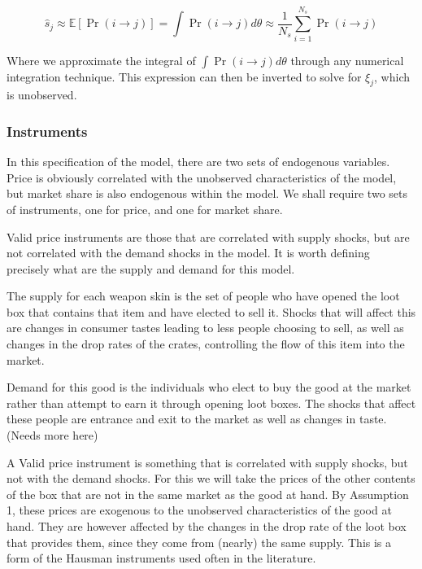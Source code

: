 \documentclass[12pt]{paper}
\newcommand{\exV}[1]{\mathbb{E} \left [ #1 \right ]}
\begin{document}
\begin{equation*}
  \hat{s}_j \approx \exV{ \Pr( i \rightarrow j )} = \int \Pr( i \rightarrow j) d\theta \approx \frac{1}{N_s}
  \sum_{i=1}^{N_s} \Pr( i \rightarrow j)
\end{equation*}

Where we approximate the integral of $\int \Pr( i \rightarrow j)d\theta$ through any
numerical integration technique. This expression can then be inverted
to solve for $\xi_j$, which is unobserved.

\subsubsection{Instruments}

In this specification of the model, there are two sets of endogenous
variables. Price is obviously correlated with the unobserved
characteristics of the model, but market share is also endogenous
within the model. We shall require two sets of instruments, one for
price, and one for market share.

Valid price instruments are those that are correlated with supply
shocks, but are not correlated with the demand shocks in the
model. It is worth defining precisely what are the supply and demand
for this model.

The supply for each weapon skin is the set of people who have opened
the loot box that contains that item and have elected to sell
it. Shocks that will affect this are changes in consumer tastes
leading to less people choosing to sell, as well as changes in the
drop rates of the crates, controlling the flow of this item into the
market.

Demand for this good is the individuals who elect to buy the good at
the market rather than attempt to earn it through opening loot
boxes. The shocks that affect these people are entrance and exit to
the market as well as changes in taste. (Needs more here)

A Valid price instrument is something that is correlated with supply
shocks, but not with the demand shocks. For this we will take the
prices of the other contents of the box that are not in the same
market as the good at hand. By Assumption 1, these prices are
exogenous to the unobserved characteristics of the good at hand. They
are however affected by the changes in the drop rate of the loot box
that provides them, since they come from (nearly) the same
supply. This is a form of the Hausman instruments used often in the
literature.
\end{document}

